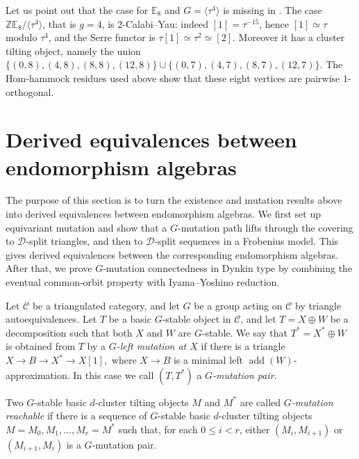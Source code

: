 \documentclass[12pt]{article}
\theoremstyle{plain}
\theoremstyle{definition}
\DeclareMathOperator{\add}{add}
\begin{document}
Let us point out that the case for \(\mathbb E_8\) and $G=\langle\tau^4\rangle$ is missing in  \cite[Theorem A.2]{Burban2008aa}. The case
\(\mathbb Z\mathbb E_8/\langle\tau^4\rangle\), that is \(g=4\), is
\(2\)-Calabi--Yau: indeed \([1]=\tau^{-15}\), hence \([1]\simeq\tau\) modulo
\(\tau^4\), and the Serre functor is
\(\tau[1]\simeq\tau^2\simeq[2]\).  Moreover it has a cluster tilting
object, namely the union
\(\{(0,8),(4,8),(8,8),(12,8)\}\cup
\{(0,7),(4,7),(8,7),(12,7)\}\).
The Hom-hammock residues used above show that these eight vertices are
pairwise \(1\)-orthogonal. 








\section{Derived equivalences between endomorphism algebras}

The purpose of this section is to turn the existence and mutation results
above into derived equivalences between endomorphism algebras.  We first set
up equivariant mutation and show that a \(G\)-mutation path lifts through the
covering to $\mathcal{D}$-split triangles, and then to \(\mathcal D\)-split sequences in a
Frobenius model.  This gives derived equivalences between the corresponding
endomorphism algebras.  After that, we prove \(G\)-mutation connectedness in
Dynkin type by combining the eventual common-orbit property with
Iyama--Yoshino reduction.

Let \(\mathcal C\) be a triangulated category, and let
\(G\) be a group acting on \(\mathcal C\) by triangle autoequivalences.  
Let \(T\) be a  basic $G$-stable  object in $\mathcal{C}$, and let \(T=X\oplus W\) be a decomposition such that both \(X\) and \(W\) are
\(G\)-stable.  We say that \(T^*=X^*\oplus W\) is obtained from \(T\) by a
\emph{\(G\)-left mutation at \(X\)} if there is a triangle
\(X\longrightarrow B\longrightarrow X^*\longrightarrow X[1],\)
where \(X\to B\) is a minimal left \(\add(W)\)-approximation.    In this case we call \((T,T^*)\) a
{\em \(G\)-mutation pair}.

Two \(G\)-stable basic \(d\)-cluster tilting objects \(M\) and \(M^*\) are
called \emph{\(G\)-mutation reachable} if there is a sequence of
\(G\)-stable basic \(d\)-cluster tilting objects
\(M=M_0,M_1,\ldots,M_r=M^*\)
such that, for each \(0\le i<r\), either \((M_i,M_{i+1})\) or
\((M_{i+1},M_i)\) is a \(G\)-mutation pair.
\end{document}
